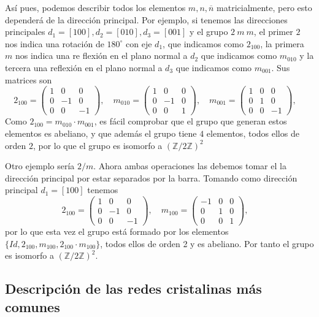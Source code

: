 \documentclass[leqno]{article}
\begin{document}
Así pues, podemos describir todos los elementos $m, n, \overline{n}$ matricialmente, pero esto dependerá de la dirección principal. Por ejemplo, si tenemos las direcciones principales $d_1=[1 0 0], d_2=[010], d_3=[001]$ y el grupo $2\ m\ m$, el primer  $2$ nos indica una rotación de $180^\circ$ con eje $d_1$, que indicamos como $2_{100}$, la primera $m$ nos indica una re flexión en el plano normal a $d_2$ que indicamos como $m_{010}$ y la tercera una reflexión en el plano normal a $d_3$ que indicamos como $m_{001}$. Sus matrices son
 \[
   2_{100} = \begin{pmatrix} 1 & 0& 0 \\ 0 & -1 & 0 \\ 0 & 0 & -1 \end{pmatrix}, \quad  
   m_{010} = \begin{pmatrix} 1 & 0& 0 \\ 0 & -1 & 0 \\ 0 & 0 & 1 \end{pmatrix}, \quad  
   m_{001} = \begin{pmatrix} 1 & 0& 0 \\ 0 & 1 & 0 \\ 0 & 0 & -1 \end{pmatrix}, \quad  
\] 
Como $2_{100} = m_{010}\cdot m_{001}$, es fácil comprobar que el grupo que generan estos elementos es abeliano, y que además  el grupo tiene  $4$ elementos, todos ellos de orden  $2$, por lo que el grupo es isomorfo a  $ (\mathbb{Z} / 2\mathbb{Z} )^2$

Otro ejemplo sería $2 / m$. Ahora ambas operaciones las debemos tomar el la dirección principal por estar separados por la barra. Tomando como dirección principal  $d_1=[100]$ tenemos
\[
   2_{100} = \begin{pmatrix} 1 & 0& 0 \\ 0 & -1 & 0 \\ 0 & 0 & -1 \end{pmatrix}, \quad  
   m_{100} = \begin{pmatrix} -1 & 0& 0 \\ 0 & 1 & 0 \\ 0 & 0 & 1 \end{pmatrix}, \quad  
\]
por lo que esta vez el grupo está formado por los elementos $\{Id, 2_{100}, m_{100}, 2_{100}\cdot m_{100}\}$, todos ellos de orden 2 y es abeliano. Por tanto el grupo es isomorfo a $(\mathbb{Z} / 2\mathbb{Z}) ^2$.

\subsection{Descripción de las redes cristalinas más comunes}
\end{document}
